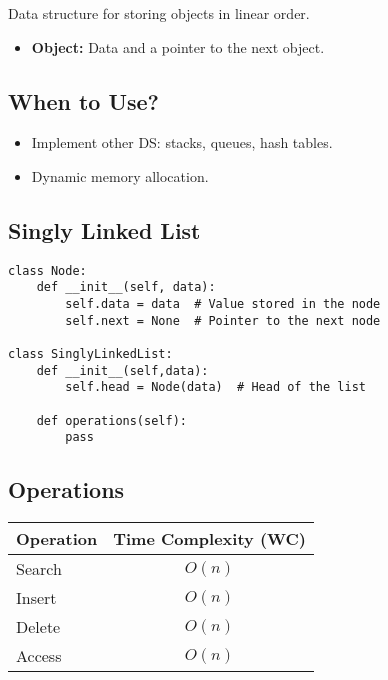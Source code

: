 \begin{summary}
    Data structure for storing objects in linear order. 
    \begin{itemize}
        \item \textbf{Object:} Data and a pointer to the next object. 
    \end{itemize}    
\end{summary}

\subsection{When to Use?}
\begin{summary}
    \begin{itemize}
        \item Implement other DS: stacks, queues, hash tables. 
        \item Dynamic memory allocation. 
    \end{itemize}
\end{summary}

\subsection{Singly Linked List}
\begin{algo}
\begin{lstlisting}
class Node:
    def __init__(self, data):
        self.data = data  # Value stored in the node
        self.next = None  # Pointer to the next node

class SinglyLinkedList:
    def __init__(self,data):
        self.head = Node(data)  # Head of the list

    def operations(self):
        pass
\end{lstlisting}
        
\end{algo}

\subsection{Operations}
\begin{summary}
    \begin{center}
        \begin{tabular}{lc}
            \toprule
            \textbf{Operation} & \textbf{Time Complexity (WC)} \\
            \midrule
            Search & $O(n)$ \\
            Insert & $O(n)$ \\
            Delete & $O(n)$ \\
            Access & $O(n)$ \\
            \bottomrule
        \end{tabular}
    \end{center}
\end{summary}
\newpage

